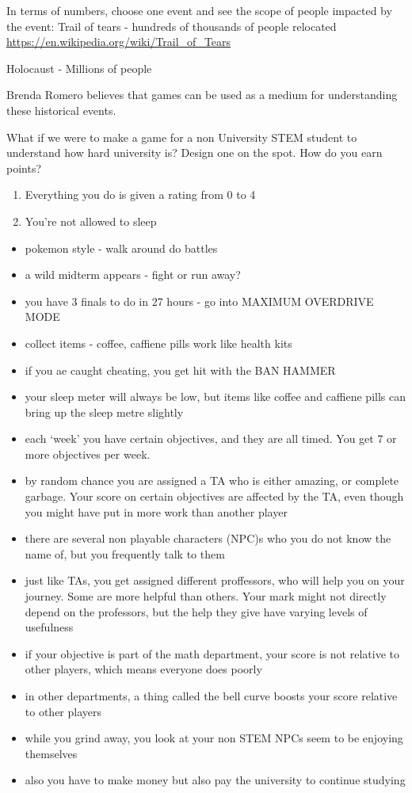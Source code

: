 \documentclass{article}
\begin{document}
In terms of numbers, choose one event and see the scope of people impacted by the event:
Trail of tears - hundreds of thousands of people relocated \url{https://en.wikipedia.org/wiki/Trail_of_Tears}

Holocaust - Millions of people


Brenda Romero believes that games can be used as a medium for understanding these historical events.


What if we were to make a game for a non University STEM student to understand how hard university is?
Design one on the spot. How do you earn points?

\begin{enumerate}
 \item Everything you do is given a rating from 0 to 4
 \item You're not allowed to sleep
\end{enumerate}

\begin{itemize}
 \item pokemon style - walk around do battles
 \item a wild midterm appears - fight or run away?
 \item you have 3 finals to do in 27 hours - go into MAXIMUM OVERDRIVE MODE
 \item collect items - coffee, caffiene pills work like health kits
 \item if you ae caught cheating, you get hit with the BAN HAMMER
 \item your sleep meter will always be low, but items like coffee and caffiene pills can bring up the sleep metre slightly
 \item each `week' you have certain objectives, and they are all timed. You get 7 or more objectives per week.
 \item by random chance you are assigned a TA who is either amazing, or complete garbage. Your score on certain objectives are affected by the TA,
       even though you might have put in more work than another player
 \item there are several non playable characters (NPC)s who you do not know the name of, but you frequently talk to them
 \item just like TAs, you get assigned different proffessors, who will help you on your journey. Some are more helpful than others.
       Your mark might not directly depend on the professors, but the help they give have varying levels of usefulness
 \item if your objective is part of the math department, your score is not relative to other players, which means
       everyone does poorly
 \item in other departments, a thing called the bell curve boosts your score relative to other players
 \item while you grind away, you look at your non STEM NPCs seem to be enjoying themselves
 \item also you have to make money but also pay the university to continue studying
\end{itemize}
\end{document}
